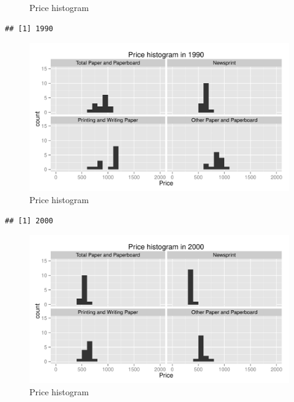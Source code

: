 \documentclass{scrartcl}\usepackage{graphicx, color}
\makeatletter
\newenvironment{kframe}{%
 \def\at@end@of@kframe{}%
 \ifinner\ifhmode%
  \def\at@end@of@kframe{\end{minipage}}%
  \begin{minipage}{\columnwidth}%
 \fi\fi%
 \def\FrameCommand##1{\hskip\@totalleftmargin \hskip-\fboxsep
 \colorbox{shadecolor}{##1}\hskip-\fboxsep
     \hskip-\linewidth \hskip-\@totalleftmargin \hskip\columnwidth}%
 \MakeFramed {\advance\hsize-\width
   \@totalleftmargin\z@ \linewidth\hsize
   \@setminipage}}%
 {\par\unskip\endMakeFramed%
 \at@end@of@kframe}
\newenvironment{knitrout}{}{} %
\makeatother
\begin{document}
\begin{knitrout}
\begin{figure}[h]
{}

\caption[Price histogram]{Price histogram\label{fig:PriceHistogram2}}
\end{figure}

\begin{kframe}\begin{verbatim}
## [1] 1990
\end{verbatim}
\end{kframe}\begin{figure}[h]


{\centering \includegraphics[width=1\linewidth]{figure/PriceHistogram3} 

}

\caption[Price histogram]{Price histogram\label{fig:PriceHistogram3}}
\end{figure}

\begin{kframe}\begin{verbatim}
## [1] 2000
\end{verbatim}
\end{kframe}\begin{figure}[h]


{\centering \includegraphics[width=1\linewidth]{figure/PriceHistogram4} 

}

\caption[Price histogram]{Price histogram\label{fig:PriceHistogram4}}
\end{figure}


\end{knitrout}
\end{document}
